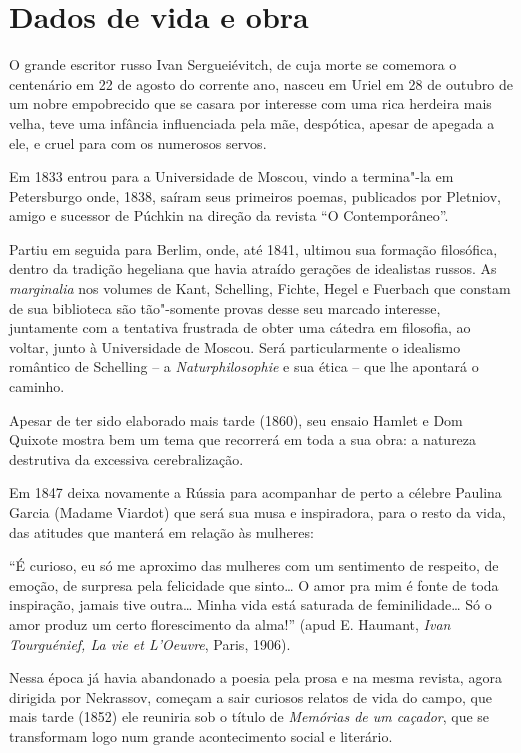 \section{Dados de vida e obra}

O grande escritor russo Ivan Sergueiévitch, de cuja morte se comemora o
centenário em 22 de agosto do corrente ano, nasceu em Uriel em 28 de
outubro de um nobre empobrecido que se casara por interesse com uma rica
herdeira mais velha, teve uma infância influenciada pela mãe, despótica,
apesar de apegada a ele, e cruel para com os numerosos servos.

Em 1833 entrou para a Universidade de Moscou, vindo a termina"-la em
Petersburgo onde, 1838, saíram seus primeiros poemas, publicados por
Pletniov, amigo e sucessor de Púchkin na direção da revista ``O
Contemporâneo''.

Partiu em seguida para Berlim, onde, até 1841, ultimou sua formação
filosófica, dentro da tradição hegeliana que havia atraído gerações de
idealistas russos. As \emph{marginalia} nos volumes de Kant, Schelling,
Fichte, Hegel e Fuerbach que constam de sua biblioteca são tão"-somente
provas desse seu marcado interesse, juntamente com a tentativa frustrada
de obter uma cátedra em filosofia, ao voltar, junto à Universidade de
Moscou. Será particularmente o idealismo romântico de Schelling -- a
\emph{Naturphilosophie} e sua ética -- que lhe apontará o caminho.

Apesar de ter sido elaborado mais tarde (1860), seu ensaio Hamlet e Dom
Quixote mostra bem um tema que recorrerá em toda a sua obra: a natureza
destrutiva da excessiva cerebralização.

Em 1847 deixa novamente a Rússia para acompanhar de perto a célebre
Paulina Garcia (Madame Viardot) que será sua musa e inspiradora, para o
resto da vida, das atitudes que manterá em relação às mulheres:

``É curioso, eu só me aproximo das mulheres com um sentimento de
respeito, de emoção, de surpresa pela felicidade que sinto\ldots{} O amor pra
mim é fonte de toda inspiração, jamais tive outra\ldots{} Minha vida está
saturada de feminilidade\ldots{} Só o amor produz um certo florescimento da
alma!'' (apud E. Haumant, \emph{Ivan Tourguénief, La vie et L'Oeuvre},
Paris, 1906).

Nessa época já havia abandonado a poesia pela prosa e na mesma revista,
agora dirigida por Nekrassov, começam a sair curiosos relatos de vida do
campo, que mais tarde (1852) ele reuniria sob o título de \emph{Memórias
de um caçador}, que se transformam logo num grande acontecimento social
e literário.

